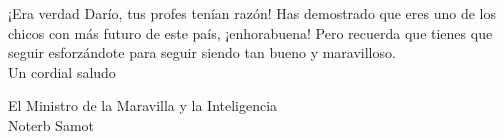 \documentclass[svgnames,addpoints]{exam}
\begin{document}
\vspace*{1.6cm}

\begin{center}
  
    \begin{minipage}{13cm}

    ¡Era verdad Darío, tus profes tenían razón! Has demostrado que eres uno de los chicos con más futuro de este país, ¡enhorabuena! Pero recuerda que tienes que seguir esforzándote para seguir siendo tan bueno y maravilloso.\\ 

    Un cordial saludo

    \vspace*{1.5cm}

    El Ministro de la  Maravilla y la Inteligencia\\
    Noterb Samot

    \end{minipage}
\end{center}
\end{document}

